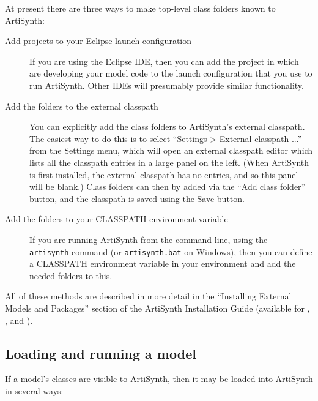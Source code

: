 At present there are three ways to make top-level class folders
known to ArtiSynth:

\begin{description}

\item[Add projects to your Eclipse launch configuration]\mbox{}

If you are using the Eclipse IDE, then you can add the project in
which are developing your model code to the launch configuration that
you use to run ArtiSynth. Other IDEs will presumably provide similar
functionality.

\item[Add the folders to the external classpath]\mbox{}

You can explicitly add the class folders to ArtiSynth's external
classpath. The easiest way to do this is to select ``{\sf Settings >
External classpath ...}'' from the {\sf Settings} menu, which will
open an external classpath editor which lists all the classpath
entries in a large panel on the left. (When ArtiSynth is first
installed, the external classpath has no entries, and so this panel
will be blank.) Class folders can then by added via
the {\sf ``Add class folder''} button, and the classpath is
saved using the {\sf Save} button.

\item[Add the folders to your CLASSPATH environment variable]\mbox{}

If you are running ArtiSynth from the command line, using the {\tt
artisynth} command (or {\tt artisynth.bat} on Windows), then you can
define a CLASSPATH environment variable in your environment and add
the needed folders to this.

\end{description}

All of these methods are described in more detail in the ``Installing
External Models and Packages'' section of the ArtiSynth Installation
Guide (available for 
, 
,
and 
).

\subsection{Loading and running a model}
\label{LoadingAndRunning:sec}

If a model's classes are visible to ArtiSynth, then it may be loaded
into ArtiSynth in several ways:


